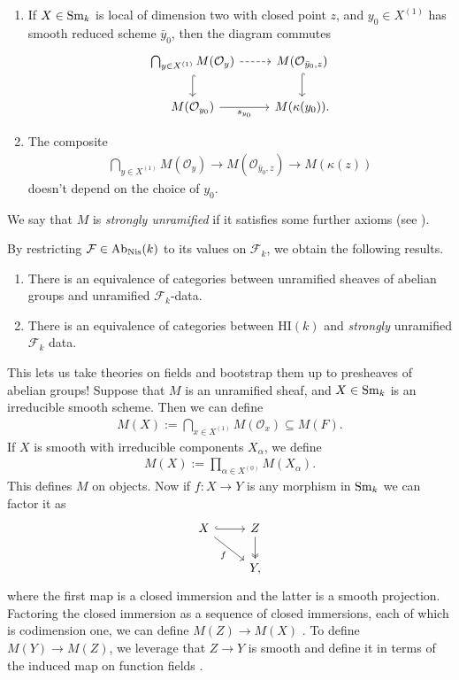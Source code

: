 \documentclass[11pt,openany]{book}
\providecommand{\HI}{\mathrm{HI}}
\begin{document}
\begin{definition}
\begin{enumerate}
    \item[\textbf{A4(i)}] If $X\in \mathrm{Sm}_k$ is local of dimension two with closed point $z$, and $y_0 \in X^{(1)}$ has smooth reduced scheme $\bar{y}_0$, then the diagram commutes
\[ \begin{tikzcd}
    \bigcap_{y\in X^{(1)}} M(\mathcal{O}_y)\dar[hook]\rar[dashed] & M(\mathcal{O}_{\bar{y}_0,z})\dar[hook]\\
    M(\mathcal{O}_{y_0})\rar["s_{y_0}" below] & M(\kappa(y_0)).
\end{tikzcd} \]

    \item[\textbf{A4(ii)}] The composite
    \begin{align*}
        \bigcap_{y\in X^{(1)}}M(\mathcal{O}_y) \to M(\mathcal{O}_{\bar{y}_0,z}) \to M(\kappa(z))
    \end{align*}
    doesn't depend on the choice of $y_0$.
\end{enumerate}
We say that $M$ is \textit{strongly unramified} if it satisfies some further axioms (see \cite[\S2]{Morel}).
\end{definition}

\begin{theorem}\label{thm:restriction-to-Fk}
\cite[2.27]{Morel} By restricting $\mathcal{F}\in \mathrm{Ab}_{\mathrm{Nis}}(k)$ to its values on $\mathcal{F}_k$, we obtain the following results.
\begin{enumerate}
    \item There is an equivalence of categories between unramified sheaves of abelian groups and unramified $\mathcal{F}_k$-data.
    \item There is an equivalence of categories between $\HI(k)$ and \textit{strongly} unramified $\mathcal{F}_k$ data.
\end{enumerate}
\end{theorem}

This lets us take theories on fields and bootstrap them up to presheaves of abelian groups! Suppose that $M$ is an unramified sheaf, and $X\in \mathrm{Sm}_k$ is an irreducible smooth scheme. Then we can define
\begin{align*}
    M(X) := \bigcap_{x\in X^{(1)}} M(\mathcal{O}_x) \subseteq M(F).
\end{align*}
If $X$ is smooth with irreducible components $X_\alpha$, we define
\begin{align*}
    M(X) := \prod_{\alpha\in X^{(0)}}M(X_\alpha).
\end{align*}
This defines $M$ on objects. Now if $f \colon X \to Y$ is any morphism in $\mathrm{Sm}_k$ we can factor it as
\[ \begin{tikzcd}
    X\rar[hook]\ar[dr,"f" below left] & Z\dar[two heads]\\
     & Y,
\end{tikzcd} \]
where the first map is a closed immersion and the latter is a smooth projection. Factoring the closed immersion as a sequence of closed immersions, each of which is codimension one, we can define $M(Z) \to M(X)$ \cite[2.13]{Morel}. To define $M(Y) \to M(Z)$, we leverage that $Z \to Y$ is smooth and define it in terms of the induced map on function fields \cite[p.~17]{Morel}.
\end{document}
